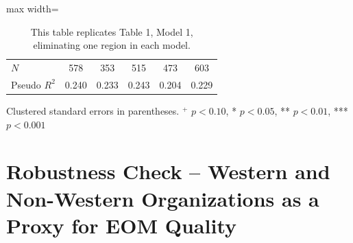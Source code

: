 \documentclass[USletter,12pt, titlepage]{article} %
\begin{document}
\begin{table}[H]
\begin{adjustbox}{max width=\textwidth}
\begin{threeparttable}
\begin{tabular}{lccccc}
\midrule
$N$ & 578 & 353 & 515 & 473 & 603 \\
Pseudo $R^{2}$ & 0.240 & 0.233 & 0.243 & 0.204 & 0.229 \\
\bottomrule
\end{tabular}
\begin{tablenotes}
\small
\item Clustered standard errors in parentheses. $^{+}$ $p<0.10$, * $p<0.05$, ** $p<0.01$, *** $p<0.001$
\end{tablenotes}
\end{threeparttable}
\end{adjustbox}
\vspace{0.5em}
\caption{This table replicates Table 1, Model 1, eliminating one region in each model.}
\end{table}
\newpage

\section{Robustness Check -- Western and Non-Western Organizations as a Proxy for EOM Quality}
\end{document}
